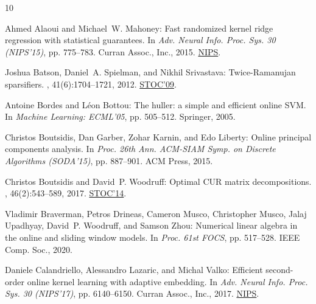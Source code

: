 \documentclass[11pt]{article}
\numberwithin{equation}{section}
\theoremstyle{definition}
\theoremstyle{plain}
\begin{document}
\tocrefpdfbookmark
\begin{thebibliography}{10}

{\sc Ahmed Alaoui and Michael~W. Mahoney}: Fast randomized kernel ridge
  regression with statistical guarantees.
\newblock In {\em Adv. Neural Info. Proc. Sys. 30 (NIPS'15)}, pp. 775--783.
  Curran Assoc., Inc., 2015.
\newblock
  \href{http://papers.nips.cc/paper/5716-fast-randomized-kernel-ridge-regression-with-statistical-guarantees}{NIPS}.

{\sc Joshua Batson, Daniel~A. Spielman, and Nikhil Srivastava}:
  Twice-{R}amanujan sparsifiers.
, 41(6):1704--1721, 2012.
\newblock \prelim \href{https://doi.org/10.1145/1536414.1536451}{STOC'09}.

{\sc Antoine Bordes and L{\'e}on Bottou}: The huller: a simple and efficient
  online {SVM}.
\newblock In {\em Machine Learning: ECML'05}, pp. 505--512. Springer, 2005.
\newblock [\epfmtdoi{10.1007/11564096\_48}]

{\sc Christos Boutsidis, Dan Garber, Zohar Karnin, and Edo Liberty}: Online
  principal components analysis.
\newblock In {\em Proc. 26th Ann. ACM-SIAM Symp. on Discrete Algorithms
  (SODA'15)}, pp. 887--901. ACM Press, 2015.
\newblock [\epfmtdoi{10.1137/1.9781611973730.61}]

{\sc Christos Boutsidis and David~P. Woodruff}: Optimal {CUR} matrix
  decompositions.
, 46(2):543--589, 2017.
\newblock \prelim \href{http://doi.org/10.1145/2591796.2591819}{STOC'14}.

{\sc Vladimir Braverman, Petros Drineas, Cameron Musco, Christopher Musco,
  Jalaj Upadhyay, David~P. Woodruff, and Samson Zhou}: Numerical linear algebra
  in the online and sliding window models.
\newblock In {\em Proc. 61st FOCS}, pp. 517--528. IEEE Comp. Soc., 2020.

{\sc Daniele Calandriello, Alessandro Lazaric, and Michal Valko}: Efficient
  second-order online kernel learning with adaptive embedding.
\newblock In {\em Adv. Neural Info. Proc. Sys. 30 (NIPS'17)}, pp. 6140--6150.
  Curran Assoc., Inc., 2017.
\newblock
  \href{https://papers.nips.cc/paper/7194-efficient-second-order-online-kernel-learning-with-adaptive-embedding}{NIPS}.


\end{thebibliography}
\end{document}
